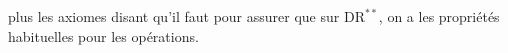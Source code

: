 
plus les axiomes disant qu'il faut pour assurer que sur $\mathrm{DR}^{**}$, on a les propriétés habituelles pour les opérations.

